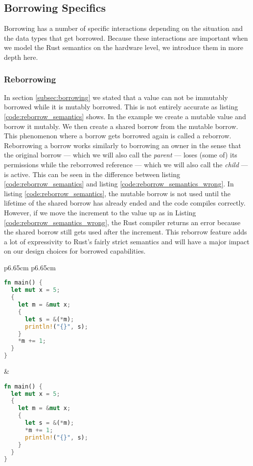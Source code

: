 \subsection{Borrowing Specifics}
Borrowing has a number of specific interactions depending on the situation and the data types that get borrowed.
Because these interactions are important when we model the Rust semantics on the hardware level, we introduce them in more depth here.

\subsubsection{Reborrowing}
\label{sec:backgroundreborrow}
In section \ref{subsec:borrowing} we stated that a value can not be immutably borrowed while it is mutably borrowed.
This is not entirely accurate as listing \ref{code:reborrow_semantics} shows.
In the example we create a mutable value and borrow it mutably.
We then create a shared borrow from the mutable borrow.
This phenomenon where a borrow gets borrowed again is called a reborrow.
Reborrowing a borrow works similarly to borrowing an owner in the sense that the original borrow --- which we will also call the \textit{parent} --- loses (some of) its permissions while the reborrowed reference --- which we will also call the \textit{child} --- is active.
This can be seen in the difference between listing \ref{code:reborrow_semantics} and listing \ref{code:reborrow_semantics_wrong}.
In listing \ref{code:reborrow_semantics}, the mutable borrow is not used until the lifetime of the shared borrow has already ended and the code compiles correctly.
However, if we move the increment to the value up as in Listing \ref{code:reborrow_semantics_wrong}, the Rust compiler returns an error because the shared borrow still gets used after the increment.
This reborrow feature adds a lot of expressivity to Rust's fairly strict semantics and will have a major impact on our design choices for borrowed capabilities.

\noindent
\begin{tabular}{p{6.65cm} p{6.65cm}}
    \begin{lstlisting}[language=Rust,frame=single,caption=Reborrow Example,label=code:reborrow_semantics]
fn main() {
  let mut x = 5;
  {
    let m = &mut x;
    {
      let s = &(*m);
      println!("{}", s);
    }
    *m += 1;
  }
}
    \end{lstlisting}

    &

    \begin{lstlisting}[language=Rust,frame=single,caption=Wrong Example,label=code:reborrow_semantics_wrong]
fn main() {
  let mut x = 5;
  {
    let m = &mut x;
    {
      let s = &(*m);
      *m += 1;
      println!("{}", s);
    }
  }
}
    \end{lstlisting}
\end{tabular}

